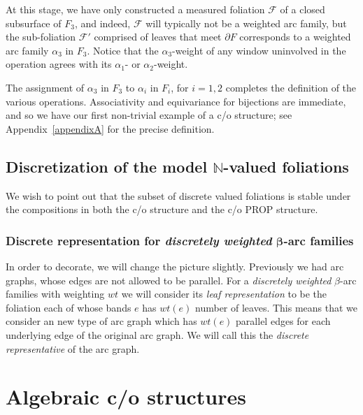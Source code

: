 \documentclass[11pt]{article}
\begin{document}
At this stage, we have only constructed a measured foliation ${\mathcal F}$ of a closed subsurface of $F_3$, and
indeed,
${\mathcal F}$ will typically not be a weighted arc family, but the sub-foliation
${\mathcal
F}'$ comprised of leaves that meet $\partial F$ corresponds to a weighted arc family $\alpha _3$ in $F_3$.
Notice that
the $\alpha _3$-weight of any window uninvolved in the operation agrees with its $\alpha _1$- or $\alpha _2$-weight.

The assignment of $\alpha_3$ in $F_3$ to $\alpha _i$ in $F_i$, for
$i=1,2$ completes the def\/inition of the various operations.
Associativity and equivariance for bijections are immediate, and so
we have our f\/irst non-trivial example of a c/o structure; see
Appendix~\ref{appendixA} for the precise def\/inition.

\setcounter{section}{3}
\setcounter{subsection}{2}
\setcounter{subsubsection}{0}
\setcounter{thm}{3}
\setcounter{equation}{0}
\subsection[Discretization of the model ${\mathbb N}$-valued foliations]{Discretization of the model $\boldsymbol{{\mathbb N}}$-valued foliations}

We wish to point out that the subset of discrete valued foliations is stable under the compositions
in both the c/o structure and the c/o PROP structure.


\subsubsection[Discrete representation for discretely weighted $\beta$-arc families]{Discrete representation for {\em discretely weighted} $\boldsymbol{\beta}$-arc families}

In order to decorate, we will change the picture slightly. Previously we had arc graphs, whose
edges are not allowed to be parallel. For a {\em discretely weighted} $\beta$-arc families with weighting $wt$
we  will consider its {\em leaf representation} to be the foliation each of whose bands $e$ has
$wt(e)$ number of leaves. This means that we consider an new type of arc graph which has $wt(e)$ parallel
edges for each underlying edge of the original arc graph. We will call this the {\em discrete representative}
of the arc graph.


\section{Algebraic c/o structures}
\label{algsection}
\end{document}
